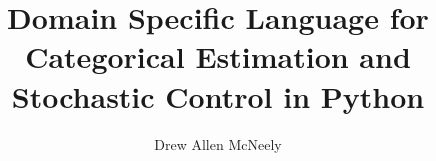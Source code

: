 \documentclass{article}
\begin{document}
\title{Domain Specific Language for Categorical Estimation and Stochastic Control in Python}
\author{Drew Allen McNeely}
\maketitle



\end{document}
